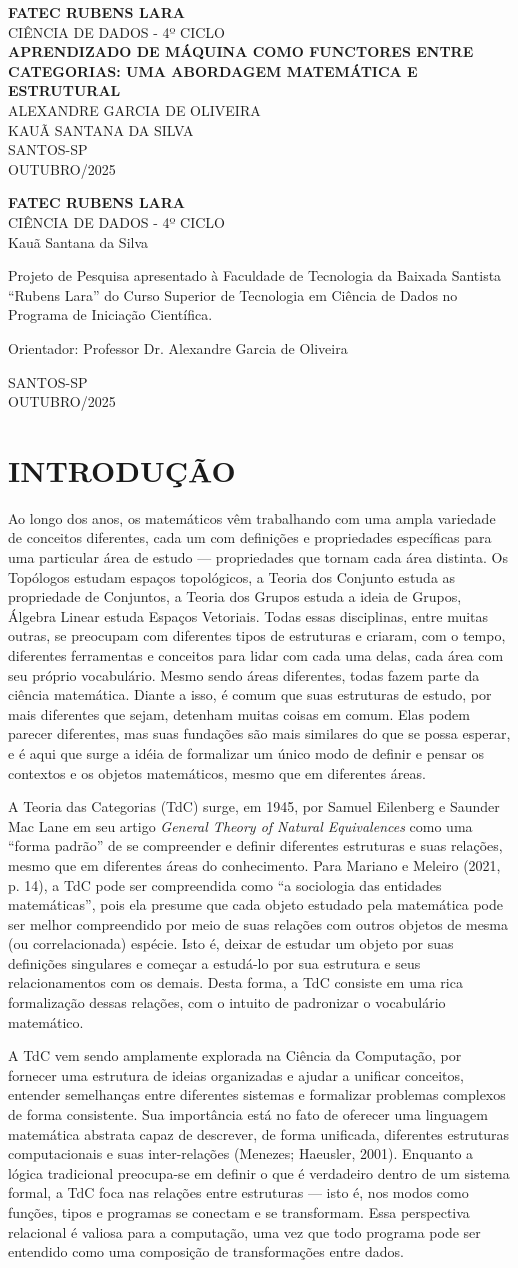 \documentclass[12pt,a4paper]{article}
\newcommand{\makecover}{
    \begin{titlepage}
        \begin{center}
            \vspace*{2cm}
            \textbf{FATEC RUBENS LARA} \\
            CIÊNCIA DE DADOS - 4º CICLO \\
            
            \vspace{4cm}
            \textbf{APRENDIZADO DE MÁQUINA COMO FUNCTORES ENTRE CATEGORIAS: UMA ABORDAGEM MATEMÁTICA E ESTRUTURAL} \\
            
            \vspace{4cm}
            ALEXANDRE GARCIA DE OLIVEIRA \\
            KAUÃ SANTANA DA SILVA\\
            
            \vfill
            SANTOS-SP\\
            OUTUBRO/2025
        \end{center}
    \end{titlepage}
}
\newcommand{\makefolharosto}{
    \begin{titlepage}
        \begin{center}
            \vspace*{2cm}
            \textbf{FATEC RUBENS LARA} \\
             CIÊNCIA DE DADOS - 4º CICLO \\
            
            \vspace{4cm}
            Kauã Santana da Silva\\
            
            \vspace{2cm}
            \begin{flushright}
            \begin{minipage}{0.5\textwidth} %
            \justifying
            Projeto de Pesquisa apresentado à Faculdade de Tecnologia da Baixada Santista “Rubens Lara” do Curso Superior de Tecnologia em Ciência de Dados no Programa de Iniciação Científica.
            
            \vspace{1cm}
            Orientador: Professor Dr. Alexandre Garcia de Oliveira
            \end{minipage}
            \end{flushright}
            
            \vfill
            SANTOS-SP\\
            OUTUBRO/2025
        \end{center}
    \end{titlepage}
}
\begin{document}
\makecover
\makefolharosto

\setcounter{page}{1}

\tableofcontents
\newpage

\section{INTRODUÇÃO}
\label{sec:int}

Ao longo dos anos, os matemáticos vêm trabalhando com uma ampla variedade de conceitos diferentes, cada um com definições e propriedades específicas para uma particular área de estudo — propriedades que tornam cada área distinta. Os Topólogos estudam espaços topológicos, a Teoria dos Conjunto estuda as propriedade de Conjuntos, a Teoria dos Grupos estuda a ideia de Grupos, Álgebra Linear estuda Espaços Vetoriais. Todas essas disciplinas, entre muitas outras, se preocupam com diferentes tipos de estruturas e criaram, com o tempo, diferentes ferramentas e conceitos para lidar com cada uma delas, cada área com seu próprio vocabulário. Mesmo sendo áreas diferentes, todas fazem parte da ciência matemática. Diante a isso, é comum que suas estruturas de estudo, por mais diferentes que sejam, detenham muitas coisas em comum. Elas podem parecer diferentes, mas suas fundações são mais similares do que se possa esperar, e é aqui que surge a idéia de formalizar um único modo de definir e pensar os contextos e os objetos matemáticos, mesmo que em diferentes áreas.

A Teoria das Categorias (TdC) surge, em 1945, por Samuel Eilenberg e Saunder Mac Lane em seu artigo \textit{General Theory of Natural Equivalences} como uma “forma padrão” de se compreender e definir diferentes estruturas e suas relações, mesmo que em diferentes áreas do conhecimento. Para Mariano e Meleiro (2021, p. 14), a TdC pode ser compreendida como “a sociologia das entidades matemáticas”, pois ela presume que cada objeto estudado pela matemática pode ser melhor compreendido por meio de suas relações com outros objetos de mesma (ou correlacionada) espécie. Isto é, deixar de estudar um objeto por suas definições singulares e começar a estudá-lo por sua estrutura e seus relacionamentos com os demais. Desta forma, a TdC consiste em uma rica formalização dessas relações, com o intuito de padronizar o vocabulário matemático.

A TdC vem sendo amplamente explorada na Ciência da Computação, por fornecer uma estrutura de ideias organizadas e ajudar a unificar conceitos, entender semelhanças entre diferentes sistemas e formalizar problemas complexos de forma consistente. Sua importância está no fato de oferecer uma linguagem matemática abstrata capaz de descrever, de forma unificada, diferentes estruturas computacionais e suas inter-relações (Menezes; Haeusler, 2001). Enquanto a lógica tradicional preocupa-se em definir o que é verdadeiro dentro de um sistema formal, a TdC foca nas relações entre estruturas — isto é, nos modos como funções, tipos e programas se conectam e se transformam. Essa perspectiva relacional é valiosa para a computação, uma vez que todo programa pode ser entendido como uma composição de transformações entre dados.
\end{document}
